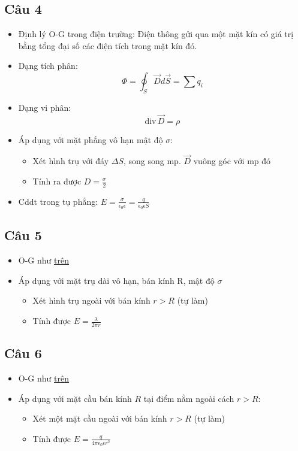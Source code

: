 \subsection{Câu 4}\label{def:o-g}

\begin{itemize}
  \item Định lý O-G trong điện trường: Điện thông gửi qua một mặt kín có giá trị bằng tổng đại số các điện tích trong mặt kín đó.
  \item Dạng tích phân: $$\Phi = \oint_S \vec{D}d\vec{S} = \sum\limits q_i$$
  \item Dạng vi phân: $$\text{div}\,\vec{D} = \rho$$
  \item Áp dụng với mặt phẳng vô hạn mật độ $\sigma$:
  \begin{itemize}
    \item Xét hình trụ với đáy $\Delta S$, song song mp. $\vec{D}$ vuông góc với mp đó
    \item Tính ra được $D = \frac{\sigma}{2}$
  \end{itemize}
  \item Cddt trong tụ phẳng: $E = \frac{\sigma}{\epsilon_0\epsilon} = \frac{q}{\epsilon_0\epsilon S}$
\end{itemize}

\subsection{Câu 5}

\begin{itemize}
  \item O-G như \hyperref[def:o-g]{trên}
  \item Áp dụng với mặt trụ dài vô hạn, bán kính R, mật độ $\sigma$
  \begin{itemize}
    \item Xét hình trụ ngoài với bán kính $r > R$ (tự làm)
    \item Tính được $E = \frac{\lambda}{2\pi r}$
  \end{itemize}
\end{itemize}

\subsection{Câu 6}

\begin{itemize}
  \item O-G như \hyperref[def:o-g]{trên}
  \item Áp dụng với mặt cầu bán kính $R$ tại điểm nằm ngoài cách $r > R$:
  \begin{itemize}
    \item Xét một mặt cầu ngoài với bán kính $r > R$ (tự làm)
    \item Tính được $E = \frac{q}{4\pi\epsilon_0\epsilon r^2}$
  \end{itemize}
\end{itemize}

